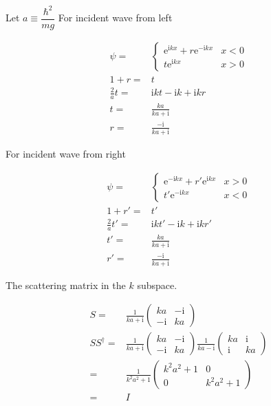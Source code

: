 \documentclass[10pt,fleqn]{article}
\newcommand{\ue}{\mathrm{e}}
\newcommand{\ui}{\mathrm{i}}
\newcommand{\eqar}[1]
{
  \begin{align*}
    #1
  \end{align*}
}
\begin{document}
\section{}
Let $a\equiv\dfrac{\hbar^2}{mg}$
For incident wave from left
\eqar{
  \psi=&\left\{
    \begin{array}{ll}
      \ue^{\ui kx}+r\ue^{-\ui kx}&x<0\\
      t\ue^{\ui kx}&x>0
    \end{array}
  \right.\\
  1+r=&t\\
  \frac{2}{a}t=&\ui kt -\ui k+\ui kr\\
  t=&\frac{ka}{ka+\ui}\\
  r=&\frac{-\ui}{ka+\ui}
}
For incident wave from right
\eqar{
  \psi=&\left\{
    \begin{array}{ll}
      \ue^{-\ui kx}+r'\ue^{\ui kx}&x>0\\
      t'\ue^{-\ui kx}&x<0
    \end{array}
  \right.\\
  1+r'=&t'\\
  \frac{2}{a}t'=&\ui kt' -\ui k+\ui kr'\\
  t'=&\frac{ka}{ka+\ui}\\
  r'=&\frac{-\ui}{ka+\ui}
}
The scattering matrix in the $k$ subspace.
\eqar{
  S=&\frac{1}{ka+\ui}\begin{pmatrix}
    ka&-\ui\\
    -\ui&ka
  \end{pmatrix}\\
  SS^\dagger=&\frac{1}{ka+\ui}\begin{pmatrix}
    ka&-\ui\\
    -\ui&ka
  \end{pmatrix}\frac{1}{ka-\ui}\begin{pmatrix}
    ka&\ui\\
    \ui&ka
  \end{pmatrix}\\
  =&\frac{1}{k^2a^2+1}\begin{pmatrix}
    k^2a^2+1&0\\
    0&k^2a^2+1
  \end{pmatrix}\\
  =&I
}
\end{document}
